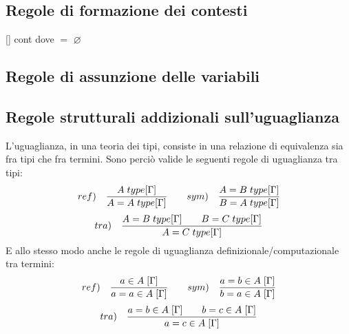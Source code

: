 \subsection{Regole di formazione dei contesti}
\label{subsec:formazione-contesti}
\begin{center} [\hspace{0.1cm}] cont \quad dove \quad [\hspace{0.1cm}] $=$ $\varnothing$ \end{center}
\begin{prooftree}
\end{prooftree}
\subsection{Regole di assunzione delle variabili}
\label{subsec:assunzione-variabili}
\begin{prooftree}
\end{prooftree}
\subsection{Regole strutturali addizionali sull'uguaglianza}
\label{subsec:uguaglianza}
L'uguaglianza, in una teoria dei tipi, consiste in una relazione di equivalenza sia fra tipi che fra termini. Sono perci\`o valide le seguenti regole di uguaglianza tra tipi:
\[ ref) \quad \frac{A\hspace{0.1cm}type[\Gamma]}{A=A\hspace{0.1cm}type[\Gamma]} \qquad sym) \quad \frac{A=B\hspace{0.1cm}type[\Gamma]}{B=A\hspace{0.1cm}type[\Gamma]} \]
\[ tra) \quad \frac{A=B\hspace{0.1cm}type[\Gamma] \qquad B=C\hspace{0.1cm}type[\Gamma]}{A=C\hspace{0.1cm}type[\Gamma]} \]
E allo stesso modo anche le regole di uguaglianza definizionale/computazionale tra termini:
\[ ref) \quad \frac{a \in A\hspace{0.1cm}[\Gamma]}{a=a \in A\hspace{0.1cm}[\Gamma]} \qquad sym) \quad \frac{a=b\in A \hspace{0.1cm}[\Gamma]}{b=a \in A\hspace{0.1cm}[\Gamma]} \]
\[ tra) \quad \frac{a=b \in A\hspace{0.1cm}[\Gamma] \qquad b=c \in A\hspace{0.1cm}[\Gamma]}{a=c \in A\hspace{0.1cm}[\Gamma]} \]
